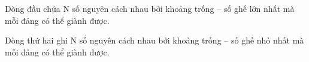 Dòng đầu chứa N số nguyên cách nhau bởi khoảng trống – số ghế lớn nhất mà mỗi đảng có thể giành được.  

   Dòng thứ hai ghi N số nguyên cách nhau bởi khoảng trống – số ghế nhỏ nhất mà mỗi đảng có thể giành được.